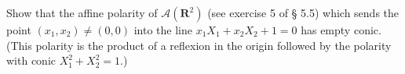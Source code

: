 Show that the affine polarity of $\mathcal{A}(\mathbf{R}^2)$ (see exercise 5 of § 5.5) which sends the point $(x_1, x_2) \neq (0, 0)$ into the line $x_1X_1 + x_2X_2 + 1 = 0$ has empty conic. (This polarity is the product of a reflexion in the origin followed by the polarity with conic $X_1^2 + X_2^2 = 1$.)
